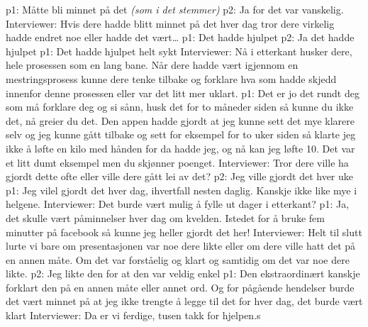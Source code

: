 \documentclass[11pt, norsk, a4paper]{article}
\begin{document}
\textcolor{myGreen} {p1: }Måtte bli minnet på det \textcolor{myGrey}{\textit{(som i det stemmer)}}
\textcolor{myYellow} {p2: }Ja for det var vanskelig.
\textcolor{myBlue} {Interviewer: }Hvis dere hadde blitt minnet på det hver dag tror dere virkelig hadde endret noe eller hadde det vært\dots
\textcolor{myGreen} {p1: }Det hadde hjulpet
\textcolor{myYellow} {p2: }Ja det hadde hjulpet
\textcolor{myGreen} {p1: }Det hadde hjulpet helt sykt
\textcolor{myBlue} {Interviewer: }Nå i etterkant husker dere, hele prosessen som en lang bane. Når dere hadde vært igjennom en mestringsprosess kunne dere tenke tilbake og forklare hva som hadde skjedd innenfor denne prosessen eller var det litt mer uklart.
\textcolor{myGreen} {p1: }Det er jo det rundt deg som må forklare deg og si sånn, husk det for to måneder siden så kunne du ikke det, nå greier du det. Den appen hadde gjordt at jeg kunne sett det mye klarere selv og jeg kunne gått tilbake og sett for eksempel for to uker siden så klarte jeg ikke å løfte en kilo med hånden for da hadde jeg, og nå kan jeg løfte 10. Det var et litt dumt eksempel men du skjønner poenget.
\textcolor{myBlue} {Interviewer: }Tror dere ville ha gjordt dette ofte eller ville dere gått lei av det?
\textcolor{myYellow} {p2: }Jeg ville gjordt det hver uke
\textcolor{myGreen} {p1: }Jeg vilel gjordt det hver dag, ihvertfall nesten daglig. Kanskje ikke like mye i helgene. 
\textcolor{myBlue} {Interviewer: }Det burde vært mulig å fylle ut dager i etterkant?
\textcolor{myGreen} {p1: }Ja, det skulle vært påminnelser hver dag om kvelden. Istedet for å bruke fem minutter på facebook så kunne jeg heller gjordt det her!
\textcolor{myBlue} {Interviewer: }Helt til slutt lurte vi bare om presentasjonen var noe dere likte eller om dere ville hatt det på en annen måte. Om det var forståelig og klart og samtidig om det var noe dere likte.
\textcolor{myYellow} {p2: }Jeg likte den for at den var veldig enkel
\textcolor{myGreen} {p1: }Den ekstraordinært kanskje forklart den på en annen måte eller annet ord. Og for pågående hendelser burde det vært minnet på at jeg ikke trengte å legge til det for hver dag, det burde vært klart
\textcolor{myBlue} {Interviewer: }Da er vi ferdige, tusen takk for hjelpen.s
\end{document}
